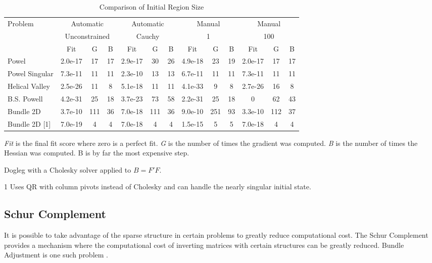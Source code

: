 \documentclass[peerreview,compsoc,onecolumn]{IEEEtran}
\begin{document}
\begin{table}[h]
\centering
\begin{threeparttable}
\caption{\label{results:initial_region}Comparison of Initial Region Size}
\begin{tabular}{|l||c|c|c||c|c|c||c|c|c||c|c|c|}
\hline
Problem        & \multicolumn{3}{c||}{Automatic} & \multicolumn{3}{c||}{Automatic} & \multicolumn{3}{c||}{Manual} & \multicolumn{3}{c|}{Manual}\\
               & \multicolumn{3}{c||}{Unconstrained} & \multicolumn{3}{c||}{Cauchy} & \multicolumn{3}{c||}{1} & \multicolumn{3}{c|}{100} \\
\hline
               & Fit     & G  & B  & Fit     & G  & B   & Fit     & G  & B  & Fit     & G  & B\\
\hline
Powel          & 2.0e-17 & 17 & 17 & 2.9e-17 & 30 & 26  & 4.9e-18 & 23 & 19 & 2.0e-17 & 17 & 17 \\
Powel Singular & 7.3e-11 & 11 & 11 & 2.3e-10 & 13 & 13  & 6.7e-11 & 11 & 11 & 7.3e-11 & 11 & 11 \\
Helical Valley & 2.5e-26 & 11 & 8  & 5.1e-18 & 11 & 11  & 4.1e-33 & 9  & 8  & 2.7e-26 & 16 & 8\\
B.S. Powell    & 4.2e-31 & 25 & 18 & 3.7e-23 & 73 & 58  & 2.2e-31 & 25 & 18 & 0       & 62 & 43 \\
Bundle 2D      & 3.7e-10 & 111& 36 & 7.0e-18 & 111& 36  & 9.0e-10 & 251& 93 & 3.3e-10 & 112 & 37 \\
Bundle 2D [1]  & 7.0e-19 & 4  & 4  & 7.0e-18 & 4  & 4   & 1.5e-15 & 5  & 5  & 7.0e-18 & 4 & 4 \\ \hline
\end{tabular}
\begin{tablenotes}
\small
\item \emph{Fit} is the final fit score where zero is a perfect fit. \emph{G} is the number of times the gradient was computed. \emph{B} is the number of times the Hessian was computed. B is by far the most expensive step.
\item Dogleg with a Cholesky solver applied to $B=F'F$. 
\item [1] Uses QR with column pivots instead of Cholesky and can handle the nearly singular initial state.
\end{tablenotes}
\end{threeparttable}
\end{table}


\subsection{Schur Complement}
It is possible to take advantage of the sparse structure in certain problems to greatly reduce computational cost. The Schur Complement provides a mechanism where the computational cost of inverting matrices with certain structures can be greatly reduced. Bundle Adjustment is one such problem \cite{triggs1999bundle}. 
\end{document}
